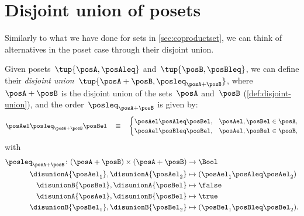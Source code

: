 
\section{Disjoint union of posets}

Similarly to what we have done for sets in \cref{sec:coproductset}, we can think of alternatives in the poset case through their disjoint union.

\begin{definition}
  Given posets~$\tup{\posA, \posAleq}$ and~$\tup{\posB, \posBleq}$, we can define their \emph{disjoint union}~$\tup{\posA + \posB, \posleq_{\posA + \posB}}$, where~$\posA + \posB$
  is the disjoint union of the sets~$\posA$ and~$\posB$ (\cref{def:disjoint-union}), and the
  order~$\posleq_{\posA + \posB}$ is given by:
  \begin{equation}
    \posAel \posleq_{\posA + \posB} \posBel \quad\equiv\quad
    \begin{cases}
      \posAel \posAleq \posBel, & \posAel,\posBel \in \posA, \\
      \posAel \posBleq \posBel, & \posAel,\posBel \in \posB,
    \end{cases}
  \end{equation}
  with
  \begin{equation}
    \begin{aligned}
      \posleq_{\posA+\posB}\colon (\posA+\posB)\times (\posA+\posB)&\to \Bool\\
      \disunionA{\posAel_1},\disunionA{\posAel_2}&\mapsto (\posAel_1\posAleq \posAel_2)\\
      \disunionB{\posBel},\disunionA{\posBel}&\mapsto \false\\
      \disunionA{\posAel},\disunionB{\posBel}&\mapsto \true\\
      \disunionB{\posBel_1},\disunionB{\posBel_2}&\mapsto (\posBel_1\posBleq \posBel_2).
    \end{aligned}
  \end{equation}
\end{definition}



